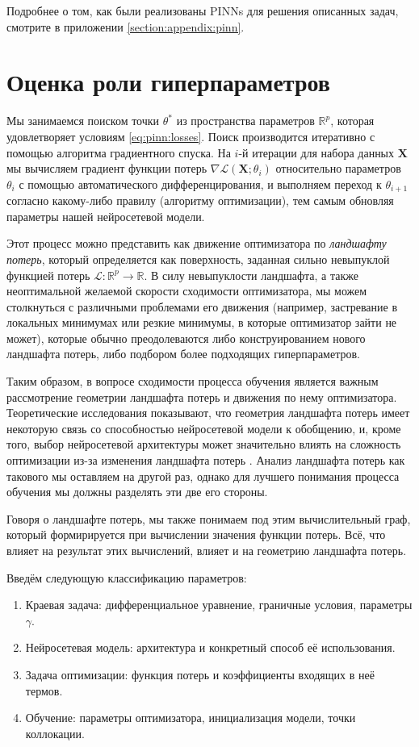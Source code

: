 \documentclass[a4paper, 12pt]{article}
\begin{document}
Подробнее о том, как были реализованы PINNs для решения описанных задач, смотрите в приложении \ref{section:appendix:pinn}.

\section{Оценка роли гиперпараметров} \label{section:hyperparameters}

Мы занимаемся поиском точки $\theta^*$ из пространства параметров $\mathbb{R}^p$, которая удовлетворяет условиям \ref{eq:pinn:losses}. Поиск производится итеративно с помощью алгоритма градиентного спуска. На $i$-й итерации для набора данных $\mathbf{X}$ мы вычисляем градиент функции потерь $\nabla \mathcal{L}(\mathbf{X}; \theta_i)$ относительно параметров $\theta_i$ с помощью автоматического дифференцирования, и выполняем переход к $\theta_{i+1}$ согласно какому-либо правилу (алгоритму оптимизации), тем самым обновляя параметры нашей нейросетевой модели.

Этот процесс можно представить как движение оптимизатора по \textit{ландшафту потерь}, который определяется как поверхность, заданная сильно невыпуклой функцией потерь $\mathcal{L}: \mathbb{R}^{p} \to \mathbb{R}$. В силу невыпуклости ландшафта, а также неоптимальной желаемой скорости сходимости оптимизатора, мы можем столкнуться с различными проблемами его движения (например, застревание в локальных минимумах или резкие минимумы, в которые оптимизатор зайти не может), которые обычно преодолеваются либо конструированием нового ландшафта потерь, либо подбором более подходящих гиперпараметров. 

Таким образом, в вопросе сходимости процесса обучения является важным рассмотрение геометрии ландшафта потерь и движения по нему оптимизатора. Теоретические исследования показывают, что геометрия ландшафта потерь имеет некоторую связь со способностью нейросетевой модели к обобщению, и, кроме того, выбор нейросетевой архитектуры может значительно влиять на сложность оптимизации из-за изменения ландшафта потерь \cite{li2018visualizing}. Анализ ландшафта потерь как такового мы оставляем на другой раз, однако для лучшего понимания процесса обучения мы должны разделять эти две его стороны.

Говоря о ландшафте потерь, мы также понимаем под этим вычислительный граф, который формирируется при вычислении значения функции потерь. Всё, что влияет на результат этих вычислений, влияет и на геометрию ландшафта потерь.

Введём следующую классификацию параметров:
\begin{enumerate}
    \item Краевая задача: дифференциальное уравнение, граничные условия, параметры $\gamma$.
    \item Нейросетевая модель: архитектура и конкретный способ её использования.
    \item Задача оптимизации: функция потерь и коэффициенты входящих в неё термов.
    \item Обучение: параметры оптимизатора, инициализация модели, точки коллокации.
\end{enumerate}
\end{document}
